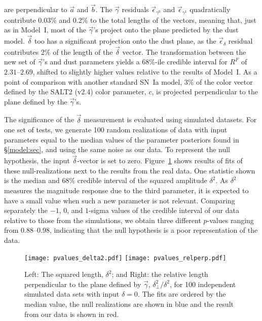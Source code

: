 \documentclass{aastex61}   	%
\begin{document}
are perpendicular to $\vec{a}$ and $\vec{b}$.
The $\vec{\gamma}$ residuals $\vec{\epsilon}_{\gamma^0}$ and
$\vec{\epsilon}_{\gamma^1} $
quadratically contribute 0.03\% and 0.2\% to the total  lengths of the vectors, meaning that, just as in Model~I, most
of the $\vec{\gamma}$'s project onto the plane predicted by the  dust model.
$\vec{\delta}$ too
has a significant projection onto the dust plane, as the $\vec{\epsilon}_{\delta}$ residual contributes 2\% of the length of the $\vec{\delta}$ vector.
The transformation between the new set of $\vec{\gamma}$'s and dust parameters yields
a 68\%-ile  credible interval for $R^F$ of  $2.31$--$2.69$, shifted to slightly  higher values relative to the results of Model~I.
As a point of comparison with another standard SN~Ia model, 3\% of the color vector defined by 
the  SALT2 (v2.4) color parameter, $c$, is  projected perpendicular to the plane defined by the $\vec{\gamma}$'s.

The significance of the $\vec{\delta}$ measurement is evaluated using simulated datasets.
For one set of tests, we generate 100 random realizations of data with input  parameters equal to the median values of the 
parameter posteriors found in
\S\ref{model:sec}, and using the same noise as our data.  
To represent the null hypothesis, the input $\vec{\delta}$-vector is set to zero.
Figure~\ref{pvalues_delta2:fig} shows results of fits of these null-realizations next  to the results from the real data.
One statistic shown is the median and 68\% credible interval of the squared amplitude  $\delta^2$.
As $\delta^2$ measures the magnitude response due to the third parameter, it is expected to have a small value
when such a new parameter is not relevant.
Comparing separately the  $-1$, 0, and $1$-sigma
values of  the credible interval of our data relative to those from the simulations, we obtain
three different $p$-values ranging from 0.88--0.98, indicating that the
null hypothesis is a poor representation of the data.

\begin{figure}[htbp] %
   \centering
   \texttt{[image: pvalues\_delta2.pdf]} 
  \texttt{[image: pvalues\_relperp.pdf]} 
            \caption{ Left: The squared length, $\delta^2$;  and Right: the relative length perpendicular to the plane defined by $\vec{\gamma}$, $\delta_\perp^2/\delta^2$, for 100 independent simulated data sets with input $\delta=0$.  The fits
            are ordered by the median value, the null realizations are shown in blue and the result from our data is shown in red.
            \label{pvalues_delta2:fig}}
\end{figure}
\end{document}
